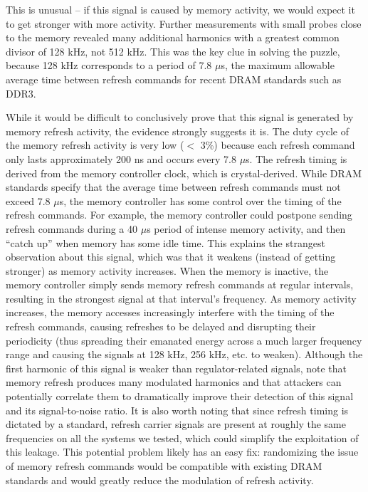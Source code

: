 This is unusual -- if this signal is caused by memory activity, we would expect it to get stronger with more activity. Further measurements with small probes close to the memory revealed many additional harmonics with a greatest common divisor of 128 kHz, not 512 kHz. This was the key clue in solving the puzzle, because 128 kHz corresponds to a period of 7.8 $\mu$s, the maximum allowable average time between refresh commands for recent DRAM standards such as DDR3.

While it would be difficult to conclusively prove that this signal is generated by memory refresh activity, the evidence strongly suggests it is. The duty cycle of the memory refresh activity is very low ($<$ 3\%) because each refresh command only lasts approximately 200 ns and occurs every 7.8 $\mu$s. The refresh timing is derived from the memory controller clock, which is crystal-derived. While DRAM standards specify that the average time between refresh commands must not exceed 7.8 $\mu$s, the memory controller has some control over the timing of the refresh commands. For example, the memory controller could postpone sending refresh commands during a 40 $\mu$s period of intense memory activity, and then ``catch up'' when memory has some idle time. This explains the strangest observation about this signal, which was that it weakens (instead of getting stronger) as memory activity increases. When the memory is inactive, the memory controller simply sends memory refresh commands at regular intervals, resulting in the strongest signal at that interval's frequency. As memory activity increases, the memory accesses increasingly interfere with the timing of the refresh commands, causing refreshes to be delayed and disrupting their periodicity (thus spreading their emanated energy across a much larger frequency range and causing the signals at 128 kHz, 256 kHz, etc. to weaken). Although the first harmonic of this signal is weaker than regulator-related signals, note that memory refresh produces many modulated harmonics and that attackers can potentially correlate them to dramatically improve their detection of this signal and its signal-to-noise ratio. It is also worth noting that since refresh timing is dictated by a standard, refresh carrier signals are present at roughly the same frequencies on all the systems we tested, which could simplify the exploitation of this leakage. This potential problem likely has an easy fix: randomizing the issue of memory refresh commands would be compatible with existing DRAM standards and would greatly reduce the modulation of refresh activity.

